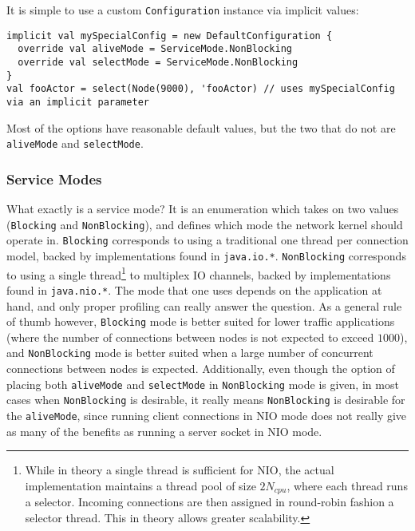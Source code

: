 \documentclass{article}
\begin{document}
It is simple to use a custom \verb|Configuration| instance via implicit values:
\begin{verbatim}
implicit val mySpecialConfig = new DefaultConfiguration {
  override val aliveMode = ServiceMode.NonBlocking
  override val selectMode = ServiceMode.NonBlocking 
}
val fooActor = select(Node(9000), 'fooActor) // uses mySpecialConfig via an implicit parameter
\end{verbatim}
Most of the options have reasonable default values, but the two that do not are \verb|aliveMode| and
\verb|selectMode|. 

\subsubsection{Service Modes}
What exactly is a service mode? It is an enumeration which takes on two values (\verb|Blocking| and \verb|NonBlocking|),
and defines which mode the network kernel should operate in. \verb|Blocking| corresponds to 
using a traditional one thread per connection model, backed by implementations found in 
\verb|java.io.*|. \verb|NonBlocking| corresponds to using a single thread\footnote{
  While in theory a single thread is sufficient for NIO, the actual implementation
  maintains a thread pool of size $2N_{cpu}$, where each thread runs a selector. Incoming
  connections are then assigned in round-robin fashion a selector thread. This in theory
  allows greater scalability. %
}
to multiplex IO channels, backed by implementations found in \verb|java.nio.*|. The mode that
one uses depends on the application at hand, and only proper profiling can really answer the
question. As a general rule of thumb however, \verb|Blocking| mode is better suited for 
lower traffic applications (where the number of connections between nodes is not expected
to exceed $1000$), and \verb|NonBlocking| mode is better suited when a large number of
concurrent connections between nodes is expected. Additionally, even though the option of placing
both \verb|aliveMode| and \verb|selectMode| in \verb|NonBlocking| mode is given, in most 
cases when \verb|NonBlocking| is desirable, it really means \verb|NonBlocking| is desirable for
the \verb|aliveMode|, since running client connections in NIO mode does not really give as many
of the benefits as running a server socket in NIO mode.
\end{document}
